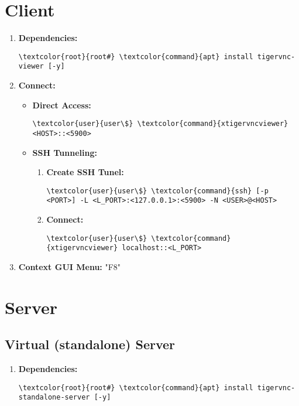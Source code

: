 \documentclass[10pt, a4paper, onecolumn, openany]{book} %
\begin{document}
\section{Client}
\begin{enumerate}
    \item \textbf{Dependencies:}
\begin{Verbatim}[commandchars=\\\{\}]
\textcolor{root}{root#} \textcolor{command}{apt} install tigervnc-viewer [-y]
\end{Verbatim}    
    \item \textbf{Connect:}
    \begin{itemize}
        \item \textbf{Direct Access:}
\begin{Verbatim}[commandchars=\\\{\}]
\textcolor{user}{user\$} \textcolor{command}{xtigervncviewer} <HOST>::<5900>
\end{Verbatim}   
    \item \textbf{SSH Tunneling:}
    \begin{enumerate}
        \item \textbf{Create SSH Tunel:}
\begin{Verbatim}[commandchars=\\\{\}]
\textcolor{user}{user\$} \textcolor{command}{ssh} [-p <PORT>] -L <L_PORT>:<127.0.0.1>:<5900> -N <USER>@<HOST>
\end{Verbatim}          
        \item \textbf{Connect:}
\begin{Verbatim}[commandchars=\\\{\}]
\textcolor{user}{user\$} \textcolor{command}{xtigervncviewer} localhost::<L_PORT>
\end{Verbatim}  
    \end{enumerate}
    \end{itemize}
    \item \textbf{Context GUI Menu:}
    \newline "F8"
\end{enumerate}
\section{Server}
\subsection{Virtual (standalone) Server}
\begin{enumerate}
    \item \textbf{Dependencies:}
\begin{Verbatim}[commandchars=\\\{\}]
\textcolor{root}{root#} \textcolor{command}{apt} install tigervnc-standalone-server [-y]
\end{Verbatim}
\end{enumerate}
\end{document}
